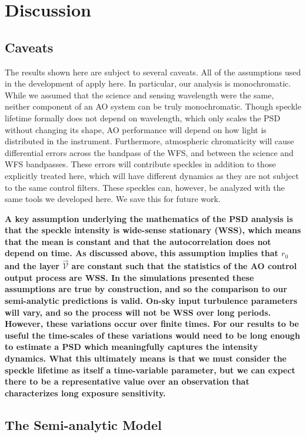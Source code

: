 \documentclass[10pt,preprint]{aastex631}
\begin{document}
\section{Discussion}
\label{sec:discussion}

\subsection{Caveats}

The results shown here are subject to several caveats.  All of the assumptions used in the development of \citet{2018JATIS...4a9001M} apply here.  In particular, our analysis is monochromatic. While we assumed that the science and sensing wavelength were the same, neither component of an AO system can be truly monochromatic.  Though speckle lifetime formally does not depend on wavelength, which only scales the PSD without changing its shape, AO performance will depend on how light is distributed in the instrument.  Furthermore, atmospheric chromaticity will cause differential errors across the bandpass of the WFS, and between the science and WFS bandpasses.  These errors will contribute speckles in addition to those explicitly treated here, which will have different dynamics as they are not subject to the same control filters.  These speckles can, however, be analyzed with the same tools we developed here.  We save this for future work.

\textbf{A key assumption underlying the mathematics of the PSD analysis is that the speckle intensity is wide-sense stationary (WSS), which means that the mean is constant and that the autocorrelation does not depend on time.  As discussed above, this assumption implies that $r_0$ and the layer $\vec{\mathcal{V}}$ are constant such that the statistics of the AO control output process are WSS.  In the simulations presented these assumptions are true by construction, and so the comparison to our semi-analytic predictions is valid.  On-sky input turbulence parameters will vary, and so the process will not be WSS over long periods.  However, these variations occur over finite times.  For our results to be useful the time-scales of these variations would need to be long enough to estimate a PSD which meaningfully captures the intensity dynamics.   What this ultimately means is that we must consider the speckle lifetime as itself a time-variable parameter, but we can expect there to be a representative value over an observation that characterizes long exposure sensitivity.}

\subsection{The Semi-analytic Model}
\end{document}

